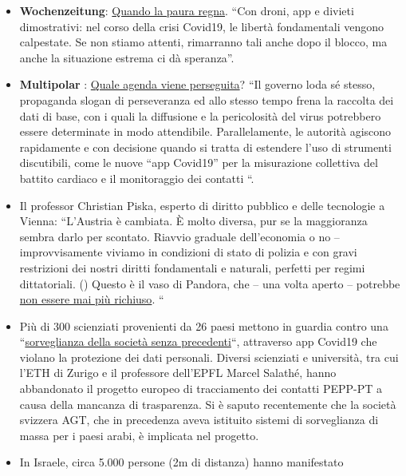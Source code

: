 \begin{itemize}
\tightlist
\item
  \textbf{Wochenzeitung}:
  \href{https://www.woz.ch/2016/grundrechte/wenn-die-angst-regiert}{Quando
  la paura regna}. ``Con droni, app e divieti dimostrativi: nel corso
  della crisi Covid19, le libertà fondamentali vengono calpestate. Se
  non stiamo attenti, rimarranno tali anche dopo il blocco, ma anche la
  situazione estrema ci dà speranza''.
\item
  \textbf{Multipolar} :
  \href{https://multipolar-magazin.de/artikel/die-massnahmen-wirken}{Quale
  agenda viene perseguita}? ``Il governo loda sé stesso, propaganda
  slogan di perseveranza ed allo stesso tempo frena la raccolta dei dati
  di base, con i quali la diffusione e la pericolosità del virus
  potrebbero essere determinate in modo attendibile. Parallelamente, le
  autorità agiscono rapidamente e con decisione quando si tratta di
  estendere l'uso di strumenti discutibili, come le nuove ``app
  Covid19'' per la misurazione collettiva del battito cardiaco e il
  monitoraggio dei contatti ``.
\item
  Il professor Christian Piska, esperto di diritto pubblico e delle
  tecnologie a Vienna: ``L'Austria è cambiata. È molto diversa, pur se
  la maggioranza sembra darlo per scontato. Riavvio graduale
  dell'economia o no -- improvvisamente viviamo in condizioni di stato
  di polizia e con gravi restrizioni dei nostri diritti fondamentali e
  naturali, perfetti per regimi dittatoriali. () Questo è il vaso di
  Pandora, che -- una volta aperto -- potrebbe
  \href{https://kurier.at/meinung/das-juristische-totschlagargument-vom-menschenleben/400814570}{non
  essere mai più richiuso}. ``
\item
  Più di 300 scienziati provenienti da 26 paesi mettono in guardia
  contro una
  ``\href{https://www.golem.de/news/corona-app-300-wissenschaftler-warnen-vor-zentraler-datenspeicherung-2004-147973.html}{sorveglianza
  della società senza precedenti}``, attraverso app Covid19 che violano
  la protezione dei dati personali. Diversi scienziati e università, tra
  cui l'ETH di Zurigo e il professore dell'EPFL Marcel Salathé, hanno
  abbandonato il progetto europeo di tracciamento dei contatti PEPP-PT a
  causa della mancanza di trasparenza. Si è saputo recentemente che la
  società svizzera AGT, che in precedenza aveva istituito sistemi di
  sorveglianza di massa per i paesi arabi, è implicata nel progetto.
\item
  In Israele, circa 5.000 persone (2m di distanza) hanno manifestato

\end{itemize}
